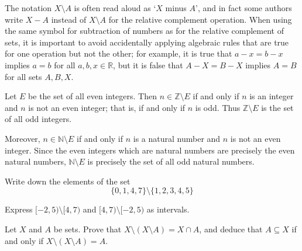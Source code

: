 \begin{aside}
The notation $X \setminus A$ is often read aloud as `$X$ minus $A$', and in fact some authors write $X - A$ instead of $X \setminus A$ for the relative complement operation. When using the same symbol for subtraction of numbers as for the relative complement of sets, it is important to avoid accidentally applying algebraic rules that are true for one operation but not the other; for example, it is true that $a-x=b-x$ implies $a=b$ for all $a,b,x \in \mathbb{R}$, but it is false that $A-X=B-X$ implies $A=B$ for all sets $A,B,X$.
\end{aside}

\begin{example}
Let $E$ be the set of all even integers. Then $n \in \mathbb{Z} \setminus E$ if and only if $n$ is an integer and $n$ is not an even integer; that is, if and only if $n$ is odd. Thus $\mathbb{Z} \setminus E$ is the set of all odd integers.

Moreover, $n \in \mathbb{N} \setminus E$ if and only if $n$ is a natural number and $n$ is not an even integer. Since the even integers which are natural numbers are precisely the even natural numbers, $\mathbb{N} \setminus E$ is precisely the set of all odd natural numbers.
\end{example}

\begin{exercise}
Write down the elements of the set
\[ \{ 0, 1, 4, 7 \} \setminus \{ 1, 2, 3, 4, 5 \} \]
\end{exercise}

\begin{exercise}
Express $[-2,5) \setminus [4,7)$ and $[4,7) \setminus [-2,5)$ as intervals.
\end{exercise}

\begin{exercise}
\label{exSetMinusSetMinus}
Let $X$ and $A$ be sets. Prove that $X \setminus (X \setminus A) = X \cap A$, and deduce that $A \subseteq X$ if and only if $X \setminus (X \setminus A) = A$.
\end{exercise}


